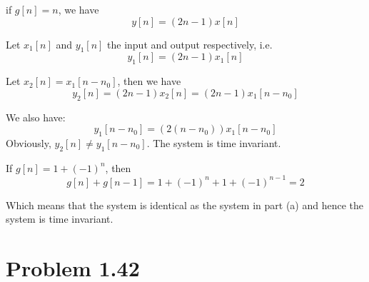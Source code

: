 \documentclass[koma,a4paper,utopia,12pt,listings-color,microtype,paralist,colorlinks,urlcolor=red]{org-article}
\begin{document}
if \(g[n] = n\), we have
\begin{equation*}
y[n] = (2n-1) x[n]
\end{equation*}

Let \(x_{1}[n]\) and \(y_{1}[n]\) the input and output respectively, i.e.
\begin{equation*}
y_{1}[n] = (2n-1)x_{1}[n]
\end{equation*}

Let \(x_{2}[n] = x_{1}[n-n_{0}]\), then we have
\begin{equation*}
y_{2}[n] = (2n-1)x_{2}[n] = (2n-1)x_{1}[n-n_{0}]
\end{equation*}

We also have:
\begin{equation*}
y_{1}[n-n_{0}] = ( 2(n-n_{0}) ) x_{1}[n-n_{0}]
\end{equation*}
Obviously, \(y_{2}[n]\neq y_{1}[n-n_{0}]\). The system is time invariant.

If \(g[n] = 1 + (-1)^{n}\), then
\begin{equation*}
g[n] + g[n-1] = 1 + (-1)^{n} + 1 + (-1)^{n-1} = 2
\end{equation*}

Which means that the system is identical as the system in part (a) and hence the
system is time invariant.
\section{Problem 1.42}
\label{sec:org8f471d7}
\end{document}
